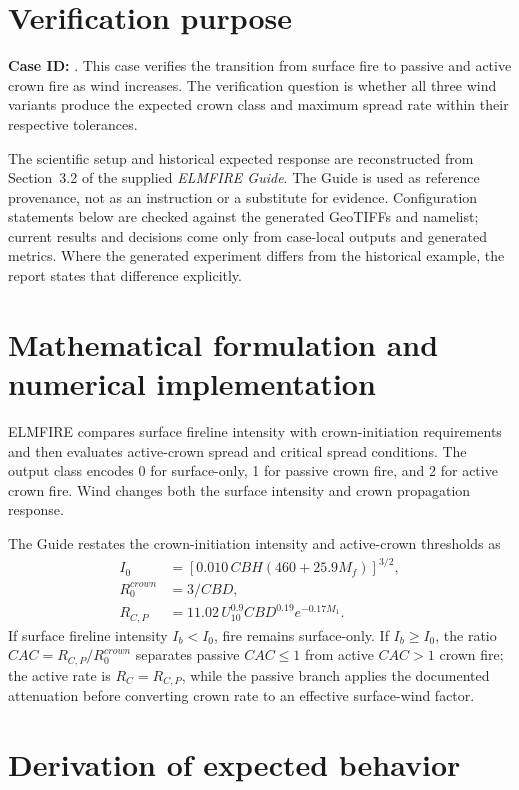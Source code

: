 \section{Verification purpose}

\textbf{Case ID:} \texttt{\CaseID}. This case verifies the transition from surface fire to passive and active crown fire as wind increases.  The verification question is whether all three wind variants produce the expected crown class and maximum spread rate within their respective tolerances.

The scientific setup and historical expected response are reconstructed from Section~3.2 of the supplied \emph{ELMFIRE Guide}. The Guide is used as reference provenance, not as an instruction or a substitute for evidence. Configuration statements below are checked against the generated GeoTIFFs and namelist; current results and decisions come only from case-local outputs and generated metrics. Where the generated experiment differs from the historical example, the report states that difference explicitly.

\section{Mathematical formulation and numerical implementation}

ELMFIRE compares surface fireline intensity with crown-initiation requirements and then evaluates active-crown spread and critical spread conditions.  The output class encodes 0 for surface-only, 1 for passive crown fire, and 2 for active crown fire.  Wind changes both the surface intensity and crown propagation response.

The Guide restates the crown-initiation intensity and active-crown thresholds as
\begin{align}
I_0&=[0.010\,CBH(460+25.9M_f)]^{3/2},\\
R_0^{crown}&=3/CBD,\\
R_{C,P}&=11.02\,U_{10}^{0.9}CBD^{0.19}e^{-0.17M_1}.
\end{align}
If surface fireline intensity \(I_b<I_0\), fire remains surface-only. If \(I_b\ge I_0\), the ratio \(CAC=R_{C,P}/R_0^{crown}\) separates passive \(CAC\le1\) from active \(CAC>1\) crown fire; the active rate is \(R_C=R_{C,P}\), while the passive branch applies the documented attenuation before converting crown rate to an effective surface-wind factor.

\section{Derivation of expected behavior}

